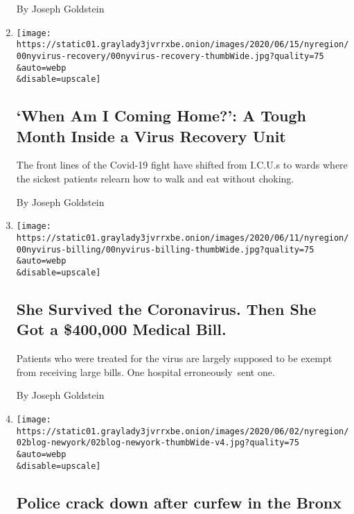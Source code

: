 \begin{enumerate}
  By Joseph Goldstein
\item
  \href{/2020/06/17/nyregion/coronavirus-recovery-hospital.html}{}

  \texttt{[image: https://static01.graylady3jvrrxbe.onion/images/2020/06/15/nyregion/00nyvirus-recovery/00nyvirus-recovery-thumbWide.jpg?quality=75\\\&auto=webp\\\&disable=upscale]}

  \hypertarget{when-am-i-coming-home-a-tough-month-inside-a-virus-recovery-unit}{%
  \subsection{`When Am I Coming Home?': A Tough Month Inside a Virus
  Recovery
  Unit}\label{when-am-i-coming-home-a-tough-month-inside-a-virus-recovery-unit}}

  The front lines of the Covid-19 fight have shifted from I.C.U.s to
  wards where the sickest patients relearn how to walk and eat without
  choking.

  By Joseph Goldstein
\item
  \href{/2020/06/14/nyregion/coronavirus-billing-nyc.html}{}

  \texttt{[image: https://static01.graylady3jvrrxbe.onion/images/2020/06/11/nyregion/00nyvirus-billing/00nyvirus-billing-thumbWide.jpg?quality=75\\\&auto=webp\\\&disable=upscale]}

  \hypertarget{she-survived-the-coronavirus-then-she-got-a-400000-medical-bill}{%
  \subsection{She Survived the Coronavirus. Then She Got a \$400,000
  Medical
  Bill.}\label{she-survived-the-coronavirus-then-she-got-a-400000-medical-bill}}

  Patients who were treated for the virus are largely supposed to be
  exempt from receiving large bills. One hospital erroneously~sent one.

  By Joseph Goldstein
\item
  \href{/live/2020/protests-george-floyd-police-06-02/police-crack-down-after-curfew-in-the-bronx}{}

  \texttt{[image: https://static01.graylady3jvrrxbe.onion/images/2020/06/02/nyregion/02blog-newyork/02blog-newyork-thumbWide-v4.jpg?quality=75\\\&auto=webp\\\&disable=upscale]}

  \hypertarget{police-crack-down-after-curfew-in-the-bronx}{%
  \subsection{Police crack down after curfew in the
  Bronx}\label{police-crack-down-after-curfew-in-the-bronx}}


\end{enumerate}
